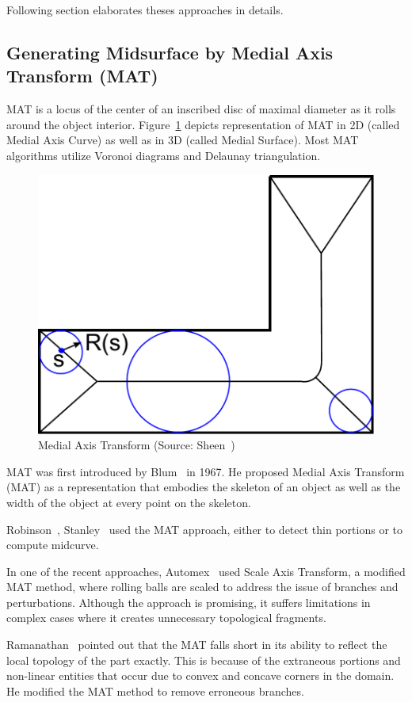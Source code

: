 Following section elaborates theses approaches in details.
 
\subsection{Generating Midsurface by Medial Axis Transform (MAT)}

MAT is a locus of the center of an inscribed disc of maximal diameter as it rolls around the object interior. Figure~\ref{fig:litsurvey:mat} depicts representation of MAT in 2D (called Medial Axis Curve) as well as in 3D (called Medial Surface). Most MAT algorithms utilize Voronoi diagrams and Delaunay triangulation. 



\begin{figure}[!h]
\centering
\includegraphics[width=0.3\linewidth]{../Common/images/MAT1.pdf}
\caption{Medial Axis Transform (Source: Sheen~\cite{Sheen2008})}
\label{fig:litsurvey:mat}
\end{figure}



MAT was first introduced by Blum~\cite{Harry1967} in 1967. He proposed Medial Axis Transform (MAT) as a representation that embodies the skeleton of an object as well as the width of the object at every point on the skeleton.  

Robinson~\cite{Robinson2006, Robinson2007}, Stanley~\cite{Stanley2010} used the MAT approach, either to detect thin portions or to compute midcurve. 

In one of the recent approaches, Automex~\cite{Automex} used Scale Axis Transform, a modified MAT method, where rolling balls are scaled to address the issue of branches and perturbations. Although the approach is promising, it suffers limitations in complex cases where it creates unnecessary topological fragments.

Ramanathan~\cite{Ramanathan2004} pointed out that the MAT falls short in its ability to reflect the local topology of the part exactly. This is because of the extraneous portions and non-linear entities that occur due to convex and concave corners in the domain. 
He modified the MAT method to remove erroneous branches. 

